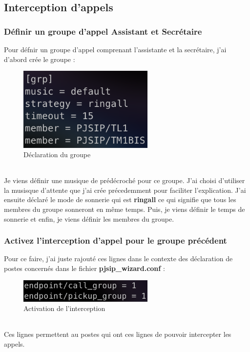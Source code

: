\documentclass[12pt, a4paper]{article}
\begin{document}
	\subsection{Interception d'appels}
	\subsubsection{Définir un groupe d'appel Assistant et Secrétaire}
	Pour défnir un groupe d'appel comprenant l'assistante et la secrétaire, j'ai
	d'abord crée le groupe :
	\begin{figure}[h]
		\centering
		\includegraphics[width=0.6\textwidth]{img/grp.png}
		\caption{Déclaration du groupe}
		\label{fig:grph}
	\end{figure}\\
	Je viens définir une musique de prédécroché pour ce groupe. J'ai choisi 
	d'utiliser la musisque d'attente que j'ai crée précedemment pour faciliter 
	l'explication. J'ai ensuite déclaré le mode de sonnerie qui est \textbf{ringall}
	ce qui signifie que tous les membres du groupe sonneront en même temps. Puis, 
	je viens définir le temps de sonnerie et enfin, je viens définir les membres
	du groupe.\\

	\subsubsection{Activez l'interception d'appel pour le groupe précédent}
	Pour ce faire, j'ai juste rajouté ces lignes dans le contexte des déclaration
	de postes concernés dans le fichier \textbf{pjsip\_wizard.conf} :
	\begin{figure}[h]
		\centering
		\includegraphics[width=0.6\textwidth]{img/lgrp.png}
		\caption{Activation de l'interception}
		\label{fig:lgrph}
	\end{figure}\\
	Ces lignes permettent au postes qui ont ces lignes de pouvoir intercepter les appels.
\end{document}
